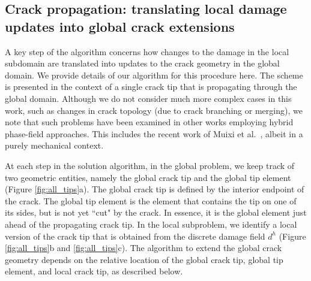 \subsection{Crack propagation: translating local damage updates into global crack extensions}\label{propagation_step}


A key step of the algorithm concerns how changes to the damage in the local subdomain are translated into updates to the crack geometry in the global domain.  We provide details of our algorithm for this procedure here.  The scheme is presented in the context of a single crack tip that is propagating through the global domain. Although we do not consider much more complex cases in this work, such as changes in crack topology (due to crack branching or merging), we note that such problems have been examined in other works employing hybrid phase-field approaches.  This includes the recent work of Muixi et al.~\cite{muixi2021combined}, albeit in a purely mechanical context.

At each step in the solution algorithm, in the global problem, we keep track of two geometric entities, namely the global crack tip and the global tip element (Figure \ref{fig:all_tips}a). The global crack tip is defined by the interior endpoint of the crack.  The global tip element is the element that contains the tip on one of its sides, but is not yet ``cut" by the crack.  In essence, it is the global element just ahead of the propagating crack tip.   In the local subproblem, we identify a local version of the crack tip that is obtained from the discrete damage field $d^h$ (Figure \ref{fig:all_tips}b and \ref{fig:all_tips}c).  
The algorithm to extend the global crack geometry depends on the relative location of the global crack tip, global tip element, and local crack tip, as described below.

